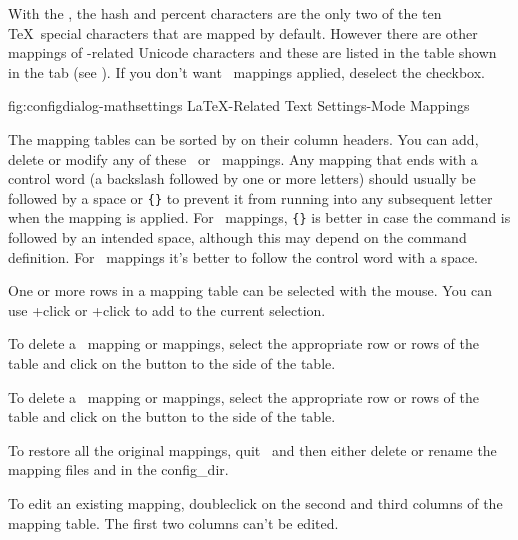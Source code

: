 
With the \mathstool, the \gls{hash} and \gls{percent} characters are the
only two of the ten \TeX\ special characters that are mapped by
default. However there are other mappings of -related Unicode
characters and these are listed in the table shown in the
 tab (see
). If you don't want
\mathsmode\ mappings applied, deselect the
 \gls*{checkbox}.

\FloatFig
  {fig:configdialog-mathsettings}
  {}
  {LaTeX-Related Text Settings\dash {}-Mode Mappings}

The mapping tables can be sorted by  on
their column headers. You can add, delete or modify any of these
\textmode\ or \mathsmode\ mappings. Any mapping that ends with a control
word (a backslash followed by one or more letters) should
usually be followed by a space or \verb|{}| to prevent it from
running into any subsequent letter when the mapping is applied. For
\textmode\ mappings, \verb|{}| is better in case the command is
followed by an intended space, although this may depend on the
command definition. For \mathsmode\ mappings it's better
to follow the control word with a space.

One or more rows in a mapping table can be selected with the mouse.
You can use +\gls{click} or 
+\gls{click} to add to the
current selection.


To delete a \textmode\ mapping or mappings, select the appropriate row or rows of the
 table and click on the
 button
to the side of the table. 


To delete a \mathsmode\ mapping or mappings, select the appropriate row or rows of the
 table and click on the
 button
to the side of the table. 

To restore all the original mappings, quit \FlowframTk\ and then
either delete or rename the mapping files  and
 in the \gls{config_dir}.

To edit an existing mapping, \gls{doubleclick} on the second and
third columns of the mapping table. The first two columns can't be
edited.

